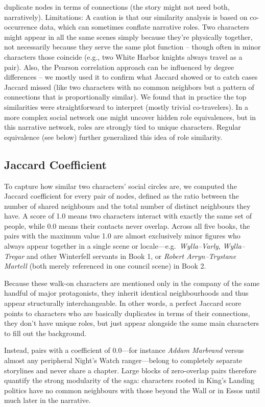 \documentclass[12pt, a4paper]{article}
\begin{document}
duplicate nodes in terms of connections (the story might not need both, narratively). Limitations: A caution is that our similarity analysis is based on co-occurrence data, which can sometimes conflate narrative roles. Two characters might appear in all the same scenes simply because they're physically together, not necessarily because they serve the same plot function – though often in minor characters those coincide (e.g., two White Harbor knights always travel as a pair). Also, the Pearson correlation approach can be influenced by degree differences – we mostly used it to confirm what Jaccard showed or to catch cases Jaccard missed (like two characters with no common neighbors but a pattern of connections that is proportionally similar). We found that in practice the top similarities were straightforward to interpret (mostly trivial co-travelers). In a more complex social network one might uncover hidden role equivalences, but in this narrative network, roles are strongly tied to unique characters. Regular equivalence (see below) further generalized this idea of role similarity.

\subsection*{Jaccard Coefficient}

To capture how similar two characters' social circles are, we computed the Jaccard coefficient for every pair of nodes, defined as the ratio between the number of shared neighbours and the total number of distinct neighbours they have.  A score of 1.0 means two characters interact with exactly the same set of people, while 0.0 means their contacts never overlap.
Across all five books, the pairs with the maximum value 1.0 are almost exclusively minor figures who always appear together in a single scene or locale—e.g.\ \textit{Wylla–Varly}, \textit{Wylla–Tregar} and other Winterfell servants in Book 1, or \textit{Robert Arryn–Trystane Martell} (both merely referenced in one council scene) in Book 2.

Because these walk-on characters are mentioned only in the company of the same handful of major protagonists,
 they inherit identical neighbourhoods and thus appear structurally interchangeable.  
In other words, a perfect Jaccard score points to characters who are basically duplicates in terms of their connections,
 they don't have unique roles, but just appear alongside the same main characters to fill out the background.

Instead, pairs with a coefficient of 0.0—for instance \textit{Addam Marbrand} versus almost any peripheral Night's Watch ranger—belong to completely separate storylines and never share a chapter.  Large blocks of zero-overlap pairs therefore quantify the strong modularity of the saga: characters rooted in King's Landing politics have no common neighbours with those beyond the Wall or in Essos until much later in the narrative.
\end{document}
